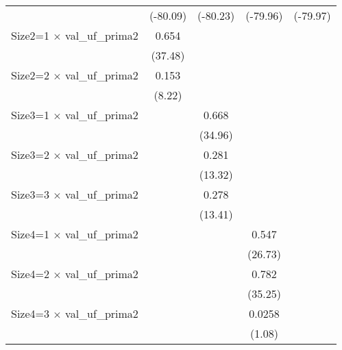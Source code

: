 {\begin{tabular}{l*{4}{c}}
                    &    (-80.09)         &    (-80.23)         &    (-79.96)         &    (-79.97)         \\
Size2=1 $\times$ val\_uf\_prima2&       0.654\sym{***}&                     &                     &                     \\
                    &     (37.48)         &                     &                     &                     \\
Size2=2 $\times$ val\_uf\_prima2&       0.153\sym{***}&                     &                     &                     \\
                    &      (8.22)         &                     &                     &                     \\
Size3=1 $\times$ val\_uf\_prima2&                     &       0.668\sym{***}&                     &                     \\
                    &                     &     (34.96)         &                     &                     \\
Size3=2 $\times$ val\_uf\_prima2&                     &       0.281\sym{***}&                     &                     \\
                    &                     &     (13.32)         &                     &                     \\
Size3=3 $\times$ val\_uf\_prima2&                     &       0.278\sym{***}&                     &                     \\
                    &                     &     (13.41)         &                     &                     \\
Size4=1 $\times$ val\_uf\_prima2&                     &                     &       0.547\sym{***}&                     \\
                    &                     &                     &     (26.73)         &                     \\
Size4=2 $\times$ val\_uf\_prima2&                     &                     &       0.782\sym{***}&                     \\
                    &                     &                     &     (35.25)         &                     \\
Size4=3 $\times$ val\_uf\_prima2&                     &                     &      0.0258         &                     \\
                    &                     &                     &      (1.08)         &                     \\

\end{tabular}}
